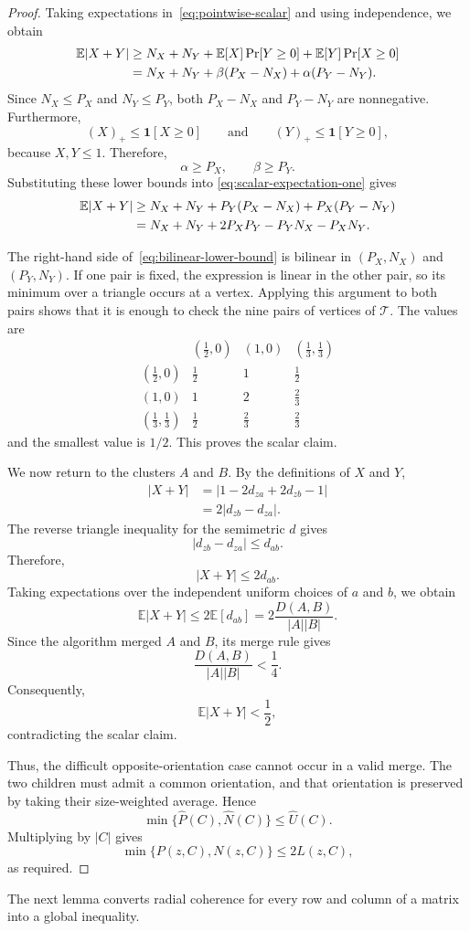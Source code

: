 \documentclass[11pt]{article}
\newcommand{\ind}{\mathbf{1}}
\begin{document}
\begin{proof}
Taking expectations in~\eqref{eq:pointwise-scalar} and using independence,
we obtain
\begin{align}
    \mathbb E|X+Y|
    &\ge
    N_X+N_Y
    +\mathbb E[X]\Pr[Y\ge0]
    +\mathbb E[Y]\Pr[X\ge0]\notag\\
    &=
    N_X+N_Y
    +\beta(P_X-N_X)
    +\alpha(P_Y-N_Y).
    \label{eq:scalar-expectation-one}
\end{align}
Since $N_X\le P_X$ and $N_Y\le P_Y$, both
$P_X-N_X$ and $P_Y-N_Y$ are nonnegative.  Furthermore,
\[
    (X)_+\le\ind[X\ge0]
    \qquad\text{and}\qquad
    (Y)_+\le\ind[Y\ge0],
\]
because $X,Y\le1$.  Therefore,
\[
    \alpha\ge P_X,
    \qquad
    \beta\ge P_Y.
\]
Substituting these lower bounds into
\eqref{eq:scalar-expectation-one} gives
\begin{align}
    \mathbb E|X+Y|
    &\ge
    N_X+N_Y
    +P_Y(P_X-N_X)
    +P_X(P_Y-N_Y)\notag\\
    &=
    N_X+N_Y+2P_XP_Y-P_YN_X-P_XN_Y.
    \label{eq:bilinear-lower-bound}
\end{align}

The right-hand side of~\eqref{eq:bilinear-lower-bound} is bilinear in
$(P_X,N_X)$ and $(P_Y,N_Y)$.  If one pair is fixed, the expression is linear
in the other pair, so its minimum over a triangle occurs at a vertex.
Applying this argument to both pairs shows that it is enough to check the
nine pairs of vertices of $\mathcal T$.  The values are
\[
\begin{array}{c|ccc}
 &(\tfrac12,0)&(1,0)&(\tfrac13,\tfrac13)\\ \hline
(\tfrac12,0)&\tfrac12&1&\tfrac12\\
(1,0)&1&2&\tfrac23\\
(\tfrac13,\tfrac13)&\tfrac12&\tfrac23&\tfrac23
\end{array}
\]
and the smallest value is $1/2$.  This proves the scalar claim.

We now return to the clusters $A$ and $B$.  By the definitions of $X$ and
$Y$,
\begin{align*}
    |X+Y|
    &=
    |1-2d_{za}+2d_{zb}-1|\\
    &=
    2|d_{zb}-d_{za}|.
\end{align*}
The reverse triangle inequality for the semimetric $d$ gives
\[
    |d_{zb}-d_{za}|\le d_{ab}.
\]
Therefore,
\[
    |X+Y|\le2d_{ab}.
\]
Taking expectations over the independent uniform choices of $a$ and $b$,
we obtain
\[
    \mathbb E|X+Y|
    \le
    2\mathbb E[d_{ab}]
    =
    2\frac{D(A,B)}{|A||B|}.
\]
Since the algorithm merged $A$ and $B$, its merge rule gives
\[
    \frac{D(A,B)}{|A||B|}<\frac14.
\]
Consequently,
\[
    \mathbb E|X+Y|<\frac12,
\]
contradicting the scalar claim.

Thus, the difficult opposite-orientation case cannot occur in a valid merge.
The two children must admit a common orientation, and that orientation is
preserved by taking their size-weighted average.  Hence
\[
    \min\{\widehat P(C),\widehat N(C)\}\le\widehat U(C).
\]
Multiplying by $|C|$ gives
\[
    \min\{P(z,C),N(z,C)\}\le2L(z,C),
\]
as required.
\end{proof}
The next lemma converts radial coherence for every row and column of a matrix
into a global inequality.
\end{document}
